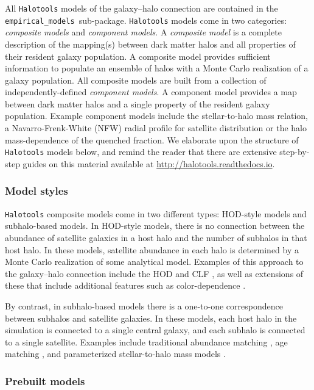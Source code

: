 \documentclass[twocolumn, tighten]{aastex6}
\newcommand{\emodels}{{\tt empirical\_models }}
\begin{document}
All {\tt Halotools} models of the galaxy--halo connection are contained in the \emodels sub-package. {\tt Halotools} models come in two categories: {\em composite models} and {\em component models}. 
A {\em composite model} is a complete description of the mapping(s) between dark matter halos and all properties of their resident galaxy population. A composite model provides sufficient information to populate an ensemble of halos with a Monte Carlo realization of a galaxy population. All composite models are built from a collection of independently-defined {\em component models}. A component model provides a map between dark matter halos and a single property of the resident galaxy population. Example component models include the stellar-to-halo mass relation, a Navarro-Frenk-White (NFW) radial profile for satellite distribution or the halo mass-dependence of the quenched fraction. We elaborate upon the structure of {\tt Halotools} models below, and remind the reader that there are extensive step-by-step guides on this material available at \url{http://halotools.readthedocs.io}.

\subsubsection{Model styles}
\label{subsubsection:modelstyles}

{\tt Halotools} composite models come in two different types: HOD-style models and subhalo-based models. In HOD-style models, there is no connection between the abundance of satellite galaxies in a host halo and the number of subhalos in that host halo. In these models, satellite abundance in each halo is determined by a Monte Carlo realization of some analytical model. Examples of this approach to the galaxy--halo connection include the HOD \citep{berlind02} and CLF \citep{yang03}, as well as extensions of these that include additional features such as color-dependence \citep{tinker_etal13}.

By contrast, in subhalo-based models there is a one-to-one correspondence between subhalos and satellite galaxies. In these models, each host halo in the simulation is connected to a single central galaxy, and each subhalo is connected to a single satellite. Examples include traditional abundance matching \citep{kravtsov04a,conroy06}, age matching \citep{HW13a}, and parameterized stellar-to-halo mass models  \citep{behroozi10, moster10}.

\subsubsection{Prebuilt models}
\label{subsubsection:prebuiltmodels}
\end{document}
